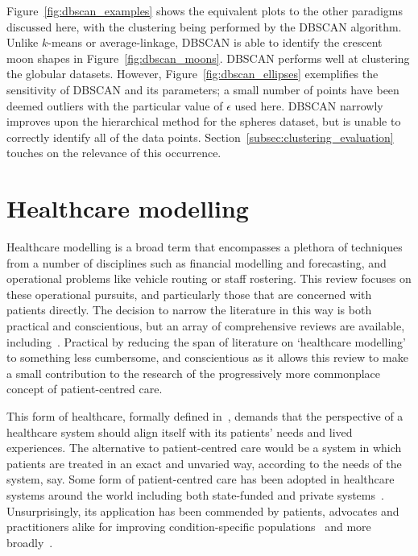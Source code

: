 Figure~\ref{fig:dbscan_examples} shows the equivalent plots to the other
paradigms discussed here, with the clustering being performed by the DBSCAN
algorithm. Unlike \(k\)-means or average-linkage, DBSCAN is able to identify the
crescent moon shapes in Figure~\ref{fig:dbscan_moons}. DBSCAN performs well at
clustering the globular datasets. However, Figure~\ref{fig:dbscan_ellipses}
exemplifies the sensitivity of DBSCAN and its parameters; a small number of
points have been deemed outliers with the particular value of \(\epsilon\) used
here. DBSCAN narrowly improves upon the hierarchical method for the spheres
dataset, but is unable to correctly identify all of the data points.
Section~\ref{subsec:clustering_evaluation} touches on the relevance of this
occurrence.

\section{Healthcare modelling}\label{sec:healthcare}

Healthcare modelling is a broad term that encompasses a plethora of techniques
from a number of disciplines such as financial modelling and forecasting, and
operational problems like vehicle routing or staff rostering. This review
focuses on these operational pursuits, and particularly those that are concerned
with patients directly. The decision to narrow the literature in this way is
both practical and conscientious, but an array of comprehensive reviews are
available, including~\cite{Brailsford2016,Galetsi2020,Kunc2018,Palmer2018}.
Practical by reducing the span of literature on `healthcare modelling' to
something less cumbersome, and conscientious as it allows this review to make a
small contribution to the research of the progressively more commonplace concept
of patient-centred care.

This form of healthcare, formally defined in~\cite{Robinson2008}, demands that
the perspective of a healthcare system should align itself with its patients'
needs and lived experiences. The alternative to patient-centred care would be a
system in which patients are treated in an exact and unvaried way, according to
the needs of the system, say. Some form of patient-centred care has been adopted
in healthcare systems around the world including both state-funded and private
systems~\cite{DoH2010,Dewi2013,Luxford2011}. Unsurprisingly, its application has
been commended by patients, advocates and practitioners alike for improving
condition-specific
populations~\cite{Foster2019,Gambling2010,Gondek2016,Tsianakas2012} and more
broadly~\cite{IAPO2012,Richards2015,Santana2019}.

